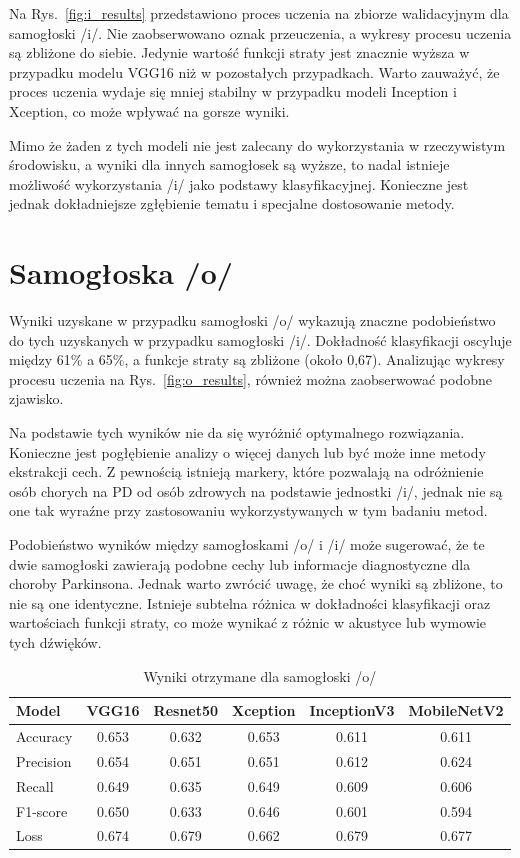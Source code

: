 Na Rys.~\ref{fig:i_results} przedstawiono proces uczenia na zbiorze walidacyjnym dla samogłoski /i/.
Nie zaobserwowano oznak przeuczenia, a wykresy procesu uczenia są zbliżone do siebie.
Jedynie wartość funkcji straty jest znacznie wyższa w przypadku modelu VGG16 niż w pozostałych przypadkach.
Warto zauważyć, że proces uczenia wydaje się mniej stabilny w przypadku modeli Inception i Xception, co może wpływać na gorsze wyniki.

Mimo że żaden z tych modeli nie jest zalecany do wykorzystania w rzeczywistym środowisku, a wyniki dla innych samogłosek są wyższe, to nadal istnieje możliwość wykorzystania /i/ jako podstawy klasyfikacyjnej.
Konieczne jest jednak dokładniejsze zgłębienie tematu i specjalne dostosowanie metody.

\section{Samogłoska /o/}
\label{sec:samogloska-o}

Wyniki uzyskane w przypadku samogłoski /o/ wykazują znaczne podobieństwo do tych uzyskanych w przypadku samogłoski /i/.
Dokładność klasyfikacji oscyluje między 61\% a 65\%, a funkcje straty są zbliżone (około 0,67).
Analizując wykresy procesu uczenia na Rys.~\ref{fig:o_results}, również można zaobserwować podobne zjawisko.

Na podstawie tych wyników nie da się wyróżnić optymalnego rozwiązania.
Konieczne jest pogłębienie analizy o więcej danych lub być może inne metody ekstrakcji cech.
Z pewnością istnieją markery, które pozwalają na odróżnienie osób chorych na PD od osób zdrowych na podstawie jednostki /i/, jednak nie są one tak wyraźne przy zastosowaniu wykorzystywanych w tym badaniu metod.

Podobieństwo wyników między samogłoskami /o/ i /i/ może sugerować, że te dwie samogłoski zawierają podobne cechy lub informacje diagnostyczne dla choroby Parkinsona.
Jednak warto zwrócić uwagę, że choć wyniki są zbliżone, to nie są one identyczne.
Istnieje subtelna różnica w dokładności klasyfikacji oraz wartościach funkcji straty, co może wynikać z różnic w akustyce lub wymowie tych dźwięków.

\begin{table}[ht]
\centering
\caption{Wyniki otrzymane dla samogłoski /o/}
\label{tab:wyniki-o}
\begin{tabular}{|l|c|c|c|c|c|}
\hline
\textbf{Model} &\textbf{VGG16} &\textbf{Resnet50} &\textbf{Xception} &\textbf{InceptionV3} &\textbf{MobileNetV2} \\ \hline
    Accuracy &0.653 &0.632 &0.653 &0.611 &0.611 \\ \hline
    Precision &0.654 &0.651 &0.651 &0.612 &0.624 \\ \hline
    Recall &0.649 &0.635 &0.649 &0.609 &0.606 \\ \hline
    F1-score &0.650 &0.633 &0.646 &0.601 &0.594 \\ \hline
    Loss &0.674 &0.679 &0.662 &0.679 &0.677\@ \\ \hline
\end{tabular}
\end{table}


